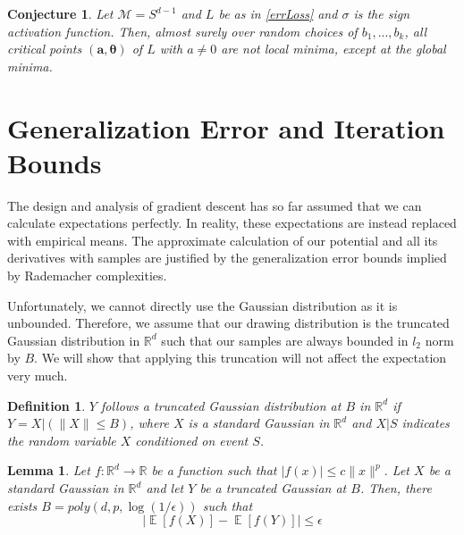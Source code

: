 \documentclass{article}
\newtheorem{lemma}[theorem]{Lemma}
\newtheorem{conjecture}[theorem]{Conjecture}
\newtheorem{definition}[theorem]{Definition}
\newcommand{\R}{{\mathbb{R}}}
\DeclareMathOperator*{\expt}{\mathbb{E}}
\begin{document}
\begin{conjecture}
 Let $\mathcal{M} = S^{d-1}$ and $L$ be as in \eqref{errLoss} and $\sigma$ is the sign activation function. Then, almost surely over random choices of $b_1,...,b_k$, all critical points $(\boldsymbol{a,\theta})$ of $L$ with $a \neq 0$ are not local minima, except at the global minima. 
\end{conjecture}



\section{Generalization Error and Iteration Bounds}
\label{finite}
 
The design and analysis of gradient descent has so far assumed that we can calculate expectations perfectly. In reality, these expectations are instead replaced with empirical means. The approximate calculation of our potential and all its derivatives with samples are justified by the generalization error bounds implied by Rademacher complexities. 

Unfortunately, we cannot directly use the Gaussian distribution as it is unbounded. Therefore, we assume that our drawing distribution is the truncated Gaussian distribution in $\R^d$ such that our samples are always bounded in $l_2$ norm by $B$. We will show that applying this truncation will not affect the expectation very much. 

\begin{definition}
$Y$ follows a truncated Gaussian distribution at $B$ in $\R^d$ if $Y = X | ( \|X\| \leq B)$, where $X$ is a standard Gaussian in $\R^d$ and $ X \Big|S$ indicates the random variable $X$ conditioned on event $S$.
\end{definition}
%
\begin{lemma}
\label{choppedLem}
Let $f : \R^d \to \R$ be a function such that $|f(x)| \leq c\|x\|^p$. Let $X$ be a standard Gaussian in $\R^d$ and let $Y$ be a truncated Gaussian at $B$. Then, there exists $B = poly(d,p,\log(1/\epsilon))$ such that 
\[ \left|\expt[f(X)] - \expt[f(Y)] \right| \leq \epsilon\]
\end{lemma}
\end{document}
